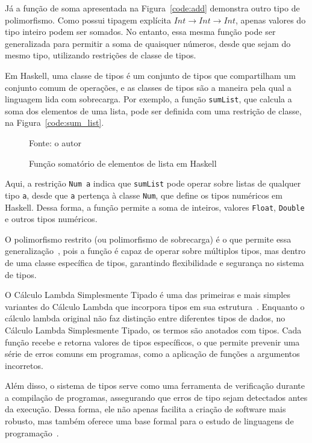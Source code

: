 Já a função de soma apresentada na Figura~\ref{code:add} demonstra outro tipo de polimorfismo.
Como possui tipagem explícita $Int \rightarrow Int \rightarrow Int$, apenas valores do tipo inteiro podem ser somados.
No entanto, essa mesma função pode ser generalizada para permitir a soma de quaisquer números, desde que sejam do mesmo tipo, utilizando restrições de classe de tipos.

Em Haskell, uma classe de tipos é um conjunto de tipos que compartilham um conjunto comum de operações, e as classes de tipos são a maneira pela qual a linguagem lida com sobrecarga.
Por exemplo, a função \texttt{sumList}, que calcula a soma dos elementos de uma lista, pode ser definida com uma restrição de classe, na Figura~\ref{code:sum_list}.

\begin{figure}
  \caption{Função somatório de elementos de lista em Haskell}
  \small{Fonte: o autor}
  
\end{figure}

Aqui, a restrição \texttt{Num a} indica que \texttt{sumList} pode operar sobre listas de qualquer tipo \texttt{a}, desde que \texttt{a} pertença à classe \texttt{Num}, que define os tipos numéricos em Haskell.
Dessa forma, a função permite a soma de inteiros, valores \texttt{Float}, \texttt{Double} e outros tipos numéricos.

O polimorfismo restrito (ou polimorfismo de sobrecarga) é o que permite essa generalização~\cite{pierce2002types}, pois a função é capaz de operar sobre múltiplos tipos, mas dentro de uma classe específica de tipos, garantindo flexibilidade e segurança no sistema de tipos.

O Cálculo Lambda Simplesmente Tipado é uma das primeiras e mais simples variantes do Cálculo Lambda que incorpora tipos em sua estrutura~\cite{church1940formulation}.
Enquanto o cálculo lambda original não faz distinção entre diferentes tipos de dados, no Cálculo Lambda Simplesmente Tipado, os termos são anotados com tipos.
Cada função recebe e retorna valores de tipos específicos, o que permite prevenir uma série de erros comuns em programas, como a aplicação de funções a argumentos incorretos.

Além disso, o sistema de tipos serve como uma ferramenta de verificação durante a compilação de programas, assegurando que erros de tipo sejam detectados antes da execução.
Dessa forma, ele não apenas facilita a criação de software mais robusto, mas também oferece uma base formal para o estudo de linguagens de programação~\cite{pierce2002types}.

